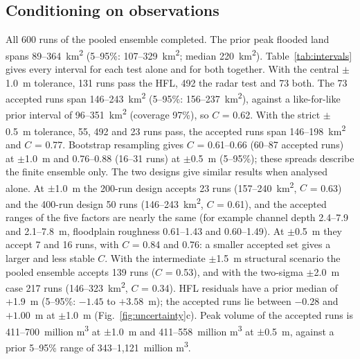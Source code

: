 \documentclass[preprint,12pt,authoryear]{elsarticle}
\newcommand{\kmsq}{km\textsuperscript{2}}
\newcommand{\Mcm}{million m\textsuperscript{3}}
\begin{document}
\subsection{Conditioning on observations}
\label{sec:conditioning}
All 600 runs of the pooled ensemble completed. The prior peak flooded land spans 89--364~\kmsq{} (5--95\%: 107--329~\kmsq; median 220~\kmsq). Table~\ref{tab:intervals} gives every interval for each test alone and for both together. With the central $\pm$1.0~m tolerance, 131 runs pass the HFL, 492 the radar test and 73 both. The 73 accepted runs span 146--243~\kmsq{} (5--95\%: 156--237~\kmsq), against a like-for-like prior interval of 96--351~\kmsq{} (coverage 97\%), so $C$ = 0.62. With the strict $\pm$0.5~m tolerance, 55, 492 and 23 runs pass, the accepted runs span 146--198~\kmsq{} and $C$ = 0.77. Bootstrap resampling gives $C$ = 0.61--0.66 (60--87 accepted runs) at $\pm$1.0~m and 0.76--0.88 (16--31 runs) at $\pm$0.5~m (5--95\%); these spreads describe the finite ensemble only. The two designs give similar results when analysed alone. At $\pm$1.0~m the 200-run design accepts 23 runs (157--240~\kmsq, $C$ = 0.63) and the 400-run design 50 runs (146--243~\kmsq, $C$ = 0.61), and the accepted ranges of the five factors are nearly the same (for example channel depth 2.4--7.9 and 2.1--7.8~m, floodplain roughness 0.61--1.43 and 0.60--1.49). At $\pm$0.5~m they accept 7 and 16 runs, with $C$ = 0.84 and 0.76: a smaller accepted set gives a larger and less stable $C$. With the intermediate $\pm$1.5~m structural scenario the pooled ensemble accepts 139 runs ($C$ = 0.53), and with the two-sigma $\pm$2.0~m case 217 runs (146--323~\kmsq, $C$ = 0.34). HFL residuals have a prior median of +1.9~m (5--95\%: $-1.45$ to $+3.58$~m); the accepted runs lie between $-0.28$ and $+1.00$~m at $\pm$1.0~m (Fig.~\ref{fig:uncertainty}c). Peak volume of the accepted runs is 411--700~\Mcm{} at $\pm$1.0~m and 411--558~\Mcm{} at $\pm$0.5~m, against a prior 5--95\% range of 343--1,121~\Mcm.
\end{document}

